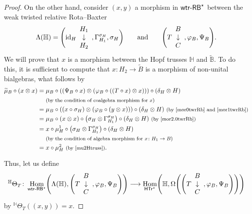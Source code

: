 \documentclass[10pt,a4paper]{amsart}
\numberwithin{equation}{section}
\DeclareMathOperator{\Hom}{Hom}
\begin{document}
\begin{proof}
On the other hand, consider $(x,y)$ a morphism in ${\sf wtr}\textnormal{-}{\sf RB}^{\star}$ between the weak twisted relative Rota--Baxter
\[
\Lambda(\mathbb{H})=\Biggl({\rm id}_{H}\begin{array}{c}H_{1}\\\downarrow\\H_{2}\end{array},\Gamma_{H_{1}}^{\sigma_{H}},\sigma_{H}\biggr)
\qquad \text{and} \qquad \Biggl(T\begin{array}{c}B\\\downarrow\\C\end{array},\varphi_{B},\Psi_{B}\Biggr).
\]
 We will prove that $x$ is a morphism between the Hopf trusses $\mathbb{H}$ and $\widetilde{\mathbb{B}}$. To do this, it is sufficient to compute that $x\colon H_{2}\rightarrow \widetilde{B}$ is a morphism of non-unital bialgebras, what follows by
\begin{align*}
\widetilde{\mu}_{B}\circ(x\otimes x)
={}&\mu_{B}\circ((\Psi_{B}\circ x)\otimes(\varphi_{B}\circ((T\circ x)\otimes x)))\circ(\delta_{H}\otimes H)\\
&{}\text{\footnotesize\textnormal{(by the condition of coalgebra morphism for $x$)}}\\
={}&\mu_{B}\circ((x\circ \sigma_{H})\otimes(\varphi_{B}\circ(y\otimes x)))\circ(\delta_{H}\otimes H)\ \text{\footnotesize\textnormal{(by \eqref{mor0twrRb} and \eqref{mor1twrRb})}}\\
={}&\mu_{B}\circ(x\otimes x)\circ\bigl(\sigma_{H}\otimes\Gamma_{H_{1}}^{\sigma_{H}}\bigr)\circ(\delta_{H}\otimes H)\ \text{\footnotesize\textnormal{(by \eqref{mor2.0twrRb})}}\\
={}&x\circ\mu_{H}^{1}\circ\bigl(\sigma_{H}\otimes \Gamma_{H_{1}}^{\sigma_{H}}\bigr)\circ(\delta_{H}\otimes H)\\
&{}\text{\footnotesize\textnormal{(by the condition of algebra morphism for $x\colon H_{1}\rightarrow B$)}}\\
={}&x\circ\mu_{H}^{2}\ \text{\footnotesize\textnormal{(by \eqref{mu2Htruss})}}.
\end{align*}

Thus, let us define
\begin{gather*}
{}^{\mathbb{H}}\Theta_{T}\colon \Hom_{{\sf wtr}\textnormal{-}{\sf RB}^{\star}}\Biggl(\Lambda(\mathbb{H}),\Biggl(T\begin{array}{c}B\\\downarrow\\C\end{array},\varphi_{B},\Psi_{B}\Biggr)\Biggr)\longrightarrow \Hom_{{\sf HTr}^{\star}}\Biggl(\mathbb{H},\Omega\Biggl(\Biggl(T\begin{array}{c}B\\\downarrow\\C\end{array},\varphi_{B},\Psi_{B}\Biggr)\Biggr)\Biggr)
\end{gather*}
by ${}^{\mathbb{H}}\Theta_{T}((x,y))=x$.


\end{proof}
\end{document}
